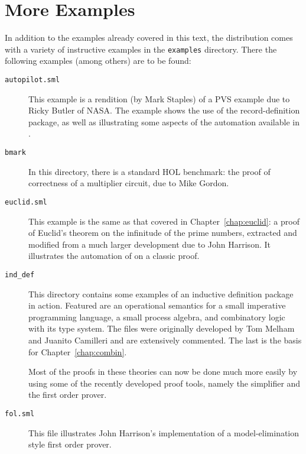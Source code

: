
\chapter{More Examples}
\label{chap:more-examples}

In addition to the examples already covered in this text, the \holn{}
distribution comes with a variety of instructive examples in the
\verb|examples| directory.  There the following examples (among
others) are to be found:

\begin{description}

\item [\tt autopilot.sml]

  This example is a \holn{} rendition (by Mark Staples) of a PVS
  example due to Ricky Butler of NASA. The example shows the use of
  the record-definition package, as well as illustrating some aspects
  of the automation available in \holn{}.

\item [\tt bmark]

  In this directory, there is a standard HOL benchmark: the proof of
  correctness of a multiplier circuit, due to Mike Gordon.

\item [\tt euclid.sml]

  This example is the same as that covered in
  Chapter~\ref{chap:euclid}: a proof of Euclid's theorem on the
  infinitude of the prime numbers, extracted and modified from a much
  larger development due to John Harrison. It illustrates the
  automation of \HOL{} on a classic proof.

\item[\tt ind\_def]

This directory contains some examples of an inductive definition package
in action. Featured are an operational semantics for a small imperative
programming language, a small process algebra, and combinatory logic
with its type system. The files were originally developed by Tom Melham
and Juanito Camilleri and are extensively commented.  The last is the
basis for Chapter~\ref{chap:combin}.

Most of the proofs in these theories can now be done much more easily by
using some of the recently developed proof tools, namely the simplifier
and the first order prover.

\item [\tt fol.sml]

  This file illustrates John Harrison's implementation of a
  model-elimination style first order prover.


\end{description}
